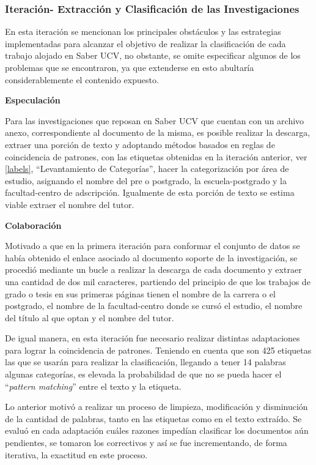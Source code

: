\documentclass[
  12pt,
  openany]{book}
\begin{document}
\hypertarget{asignacion}{%
\subsubsection{Iteración- Extracción y Clasificación de las Investigaciones}\label{asignacion}}

En esta iteración se mencionan los principales obstáculos y las estrategias implementadas para alcanzar el objetivo de realizar la clasificación de cada trabajo alojado en Saber UCV, no obstante, se omite especificar algunos de los problemas que se encontraron, ya que extenderse en esto abultaría considerablemente el contenido expuesto.

\textbf{Especulación}

Para las investigaciones que reposan en Saber UCV que cuentan con un archivo anexo, correspondiente al documento de la misma, es posible realizar la descarga, extraer una porción de texto y adoptando métodos basados en reglas de coincidencia de patrones, con las etiquetas obtenidas en la iteración anterior, ver \ref{labels}, ``Levantamiento de Categorías'', hacer la categorización por área de estudio, asignando el nombre del pre o postgrado, la escuela-postgrado y la facultad-centro de adscripción. Igualmente de esta porción de texto se estima viable extraer el nombre del tutor.

\textbf{Colaboración}

Motivado a que en la primera iteración para conformar el conjunto de datos se había obtenido el enlace asociado al documento soporte de la investigación, se procedió mediante un bucle a realizar la descarga de cada documento y extraer una cantidad de dos mil caracteres, partiendo del principio de que los trabajos de grado o tesis en sus primeras páginas tienen el nombre de la carrera o el postgrado, el nombre de la facultad-centro donde se cursó el estudio, el nombre del título al que optan y el nombre del tutor.

De igual manera, en esta iteración fue necesario realizar distintas adaptaciones para lograr la coincidencia de patrones. Teniendo en cuenta que son 425 etiquetas las que se usarán para realizar la clasificación, llegando a tener 14 palabras algunas categorías, es elevada la probabilidad de que no se pueda hacer el ``\emph{pattern matching}'' entre el texto y la etiqueta.

Lo anterior motivó a realizar un proceso de limpieza, modificación y disminución de la cantidad de palabras, tanto en las etiquetas como en el texto extraído. Se evaluó en cada adaptación cuáles razones impedían clasificar los documentos aún pendientes, se tomaron los correctivos y así se fue incrementando, de forma iterativa, la exactitud en este proceso.
\end{document}

